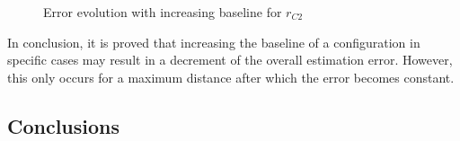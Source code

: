 \begin{figure}[!htbp]
	\captionsetup{justification=centering,margin=2cm}
	\caption{Error evolution with increasing baseline for $r_{C2}$}
	\label{fig:plot-baseline-increase-2}
\end{figure}

In conclusion, it is proved that increasing the baseline of a configuration in specific cases may result in a decrement of the overall estimation error. However, this only occurs for a maximum distance after which the error becomes constant. 

\subsection{Conclusions}

